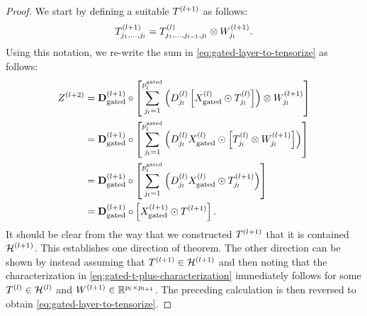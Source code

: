 \gatedReLULayerElimination*
\begin{proof}
    We start by defining a suitable \( T^{(l+1)} \) as follows:
    \begin{equation}\label{eq:gated-t-plus-characterization}
        T^{(l+1)}_{j_1, \ldots, j_l}
        = T^{(l)}_{j_1, \ldots, j_{l-1}, j_l} \otimes W^{(l+1)}_{j_l}.
    \end{equation}
    Using this notation, we re-write the sum
    in \cref{eq:gated-layer-to-tensorize} as follows:
    \begin{align*}
        Z^{(l+2)}
         & = \mathbf{D}^{(l+1)}_\text{gated} \circ
        \left[\sum_{j_l=1}^{p_l^{\text{gated}}} \left(D^{(l)}_{j_l} \left[X^{(l)}_{\text{gated}} \odot T^{(l)}_{j_l}\right]\right)
        \otimes W^{(l+1)}_{j_l}\right]                                                      \\
         & = \mathbf{D}^{(l+1)}_\text{gated} \circ
        \left[\sum_{j_l=1}^{p_l^{\text{gated}}} \left(D^{(l)}_{j_l} X^{(l)}_{\text{gated}} \odot \left[T^{(l)}_{j_l}
        \otimes W^{(l+1)}_{j_l}\right]\right)\right]                                                    \\
         & = \mathbf{D}^{(l+1)}_\text{gated} \circ
        \left[\sum_{j_l=1}^{p_l^{\text{gated}}} \left(D^{(l)}_{j_l} X^{(l)}_{\text{gated}} \odot T^{(l+1)}_{j_l}\right)\right] \\
         & = \mathbf{D}^{(l+1)}_\text{gated} \circ \left[X^{(l+1)}_{\text{gated}} \odot T^{(l+1)}\right].
    \end{align*}
    It should be clear from the way that we constructed \( T^{(l+1)} \) that
    it is contained \( \mathcal{H}^{(l+1)} \).
    This establishes one direction of theorem.
    The other direction can be shown by instead assuming that
    \( T^{(l+1)} \in \mathcal{H}^{(l+1)} \) and then noting that the characterization
    in \cref{eq:gated-t-plus-characterization} immediately follows for some
    \( T^{(l)} \in \mathcal{H}^{(l)} \) and \( W^{(l+1)} \in \mathbb{R}^{p_l \times p_{l+1}} \).
    The preceding calculation is then reversed to obtain
    \cref{eq:gated-layer-to-tensorize}.
\end{proof}

